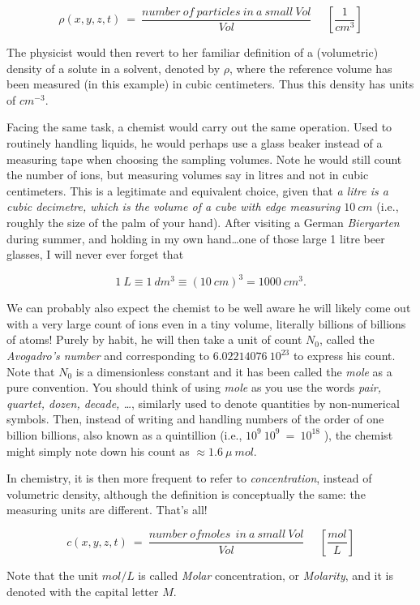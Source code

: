 \[
  \rho(x,y,z,t)\ =\ \frac{number\ of\ particles\ in\ a\ small\ Vol}{Vol}\ \ \ \ \ \ \left[\frac{1}{cm^3}\right]
\]

The physicist would then revert to her familiar definition of a (volumetric) density of a solute in a solvent, denoted by \( \rho \), where the reference volume has been measured (in this example) in cubic centimeters. Thus this density has units of \(cm^{ - 3}\).

Facing the same task, a chemist would carry out the same operation. Used to routinely handling liquids, he would perhaps use a glass beaker instead of a measuring tape when choosing the sampling volumes. Note he would still count the number of ions, but measuring volumes say in litres and not in cubic centimeters. This is a legitimate and equivalent choice, given that \textit{a litre is a cubic decimetre, which is the volume of a cube with edge measuring} \(10\ cm\) (i.e., roughly the size of the palm of your hand). After visiting a German \textit{Biergarten} during summer, and holding in my own hand\ldots one of those large 1 litre beer glasses, I will never ever forget that

\[
	1\ L \equiv 1\ dm^3 \equiv {(10\ cm)}^3 = 1000\ cm^3. 
\]

We can probably also expect the chemist to be well aware he will likely come out with a very large count of ions even in a tiny volume, literally billions of billions of atoms! Purely by habit, he will then take a unit of count \( N_0 \), called the \textit{Avogadro's number} and corresponding to \( 6.02214076\ 10^{23} \) to express his count. Note that \( N_0 \) is a dimensionless constant and it has been called the \textit{mole} as a pure convention. You should think of using \textit{mole} as you use the words \textit{pair, quartet, dozen, decade, \ldots }, similarly used to denote quantities by non-numerical symbols. Then, instead of writing and handling numbers of the order of one billion billions, also known as a quintillion (i.e., \( 10^9\ 10^9\ =\ 10^{18} \) ), the chemist might simply note down his count as \( \approx 1.6\ \mu\ mol \).

In chemistry, it is then more frequent to refer to \textit{concentration}, instead of volumetric density, although the definition is conceptually the same: the measuring units are different. That's all!  

\[
  c(x,y,z,t)\ =\ \frac{number\ of moles\ \ in\ a\ small\ Vol}{Vol}\ \ \ \ \ \ \left[\frac{mol}{L}\right]
\]

Note that the unit \(mol / L\) is called \textit{Molar} concentration, or \textit{Molarity}, and it is denoted with the capital letter \(M\). 

